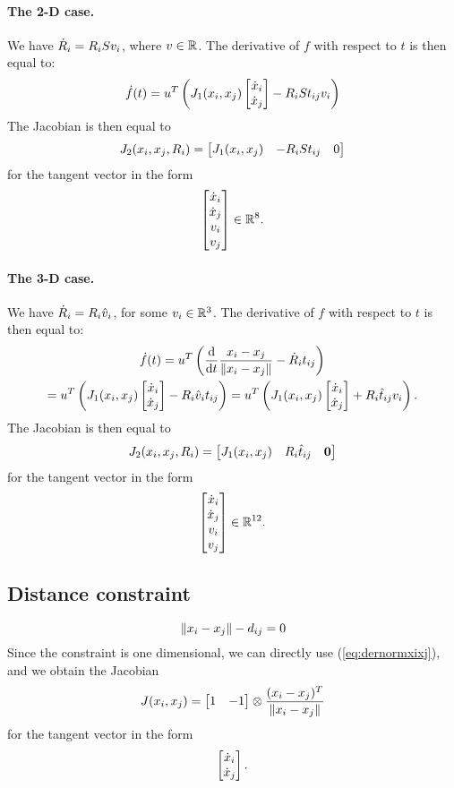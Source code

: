 \documentclass[12pt]{article}
\newcommand{\xixj}{x_i-x_j}
\newcommand{\nxixj}{\frac{\xixj}{\norm{\xixj}}}
\newcommand{\Ri}{R_i}
\newcommand{\dxi}{\dot{x}_i}
\newcommand{\dxj}{\dot{x}_j}
\newcommand{\kron}{\otimes}
\newcommand{\htij}{\hat{t}_{ij}}
\begin{document}
\paragraph{The 2-D case.} We have $\dRi=\Ri S v_i$, where $v\in\mathbb{R}^{}{}$. The derivative of $f$ with respect to $t$ is then equal to:
\begin{equation}
  \dot{f}(t)=u\transpose\left(J_1(x_i,x_j) \bmat{\dxi\\\dxj}-\Ri S\tij v_i\right)
\end{equation}
The Jacobian is then equal to
\begin{equation}
  J_2(x_i,x_j,R_i)=\bmat{J_1(x_i,x_j) & - \Ri S \tij & 0}
\end{equation}
for the tangent vector in the form
\begin{equation}
  \bmat{\dxi\\\dxj\\v_i\\v_j}\in\real{8}.
\end{equation}
\paragraph{The 3-D case.} We have $\dRi=\Ri\hat{v}_i$, for some $v_i\in\mathbb{R}^{3}{}$. The derivative of $f$ with respect to $t$ is then equal to:
\begin{multline}
  \dot{f}(t)=u\transpose\left(\dert\nxixj-\dRi\tij\right)\\
=u\transpose\left(J_1(x_i,x_j) \bmat{\dxi\\\dxj}-\Ri\hat{v}_i\tij\right)
=u\transpose\left(J_1(x_i,x_j) \bmat{\dxi\\\dxj}+\Ri\htij v_i\right).
\end{multline}
The Jacobian is then equal to
\begin{equation}
  J_2(x_i,x_j,R_i)=\bmat{J_1(x_i,x_j) & \Ri\htij & \vct{0}}
\end{equation}
for the tangent vector in the form
\begin{equation}
  \bmat{\dxi\\\dxj\\v_i\\v_j}\in\real{12}.
\end{equation}
\subsection{Distance constraint}
\begin{equation}
  \norm{\xixj}-d_{ij}=0  
\end{equation}
Since the constraint is one dimensional, we can directly use (\ref{eq:dernormxixj}), and we obtain the Jacobian
\begin{equation}
  J(x_i,x_j)=\bmat{1 & -1}\kron\frac{(\xixj)\transpose}{\norm{\xixj}}
\end{equation}
for the tangent vector in the form
\begin{equation}
  \bmat{\dxi\\\dxj}.  
\end{equation}
\end{document}
